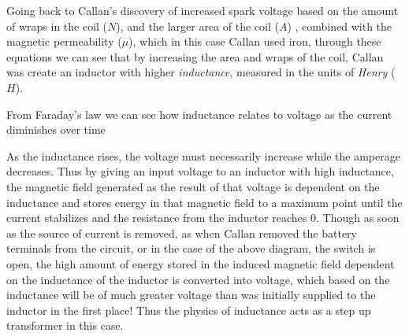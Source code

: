 \documentclass[12pt]{article}
\begin{document}
Going back to Callan's discovery of increased spark voltage based on the amount of wraps in the coil (${N}$), and the larger area of the coil (${A}$) , combined with the magnetic permeability  (${\mu}$),  which in this case Callan used iron, through these equations we can see that by increasing the area and wraps of the coil, Callan was create an inductor with higher \textit{inductance}, measured in the units of \textit{Henry} (${H}$). 

	\begin{center}
		From Faraday's law we can see how inductance relates to voltage as the current diminishes over time\\
		\vspace{5mm}
		\begin{LARGE}
			\end {LARGE}
	\end{center}

As the inductance rises, the voltage must necessarily increase while the amperage decreases. Thus by giving an input voltage to an inductor with high inductance, the magnetic field generated as the result of that voltage is dependent on the inductance and stores energy in that magnetic field to a maximum point until the current stabilizes and the resistance from the inductor reaches 0. Though as soon as the source of current is removed, as when Callan removed the battery terminals from the circuit, or in the case of the above diagram, the switch is open, the high amount of energy stored in the induced magnetic field dependent on the inductance of the inductor is converted into voltage, which based on the inductance will be of much greater voltage than was initially supplied to the inductor in the first place!
Thus the physics of inductance acts as a step up transformer in this case. 
\end{document}
